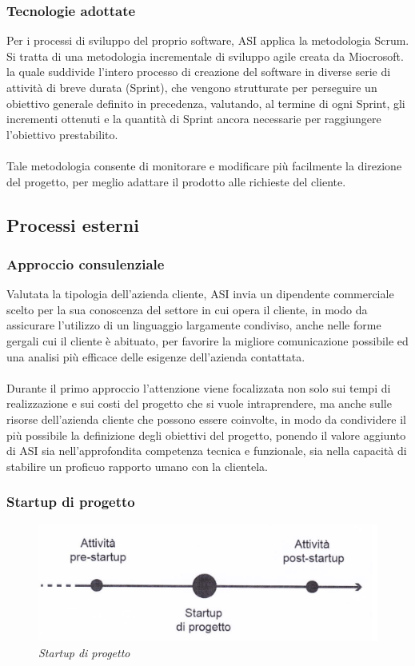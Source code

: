 \subsubsection{Tecnologie adottate}
Per i processi di sviluppo del proprio software, ASI applica la metodologia Scrum.\\
Si tratta di una metodologia incrementale di sviluppo agile creata da Miocrosoft. la quale suddivide l'intero processo di creazione del software in diverse serie di attività di breve durata (Sprint), che vengono strutturate per perseguire un obiettivo generale definito in precedenza, valutando, al termine di ogni Sprint, gli incrementi ottenuti e la quantità di Sprint ancora necessarie per raggiungere l'obiettivo prestabilito.
\\\\
Tale metodologia consente di monitorare e modificare più facilmente la direzione del progetto, per meglio adattare il prodotto alle richieste del cliente.
\subsection{Processi esterni}
\subsubsection{Approccio consulenziale}
Valutata la tipologia dell'azienda cliente, ASI invia un dipendente commerciale scelto per la sua conoscenza del settore in cui opera il cliente, in modo da assicurare l'utilizzo di un linguaggio largamente condiviso, anche nelle forme gergali cui il cliente è abituato, per favorire la migliore comunicazione possibile ed una analisi più efficace delle esigenze dell'azienda contattata.
\\\\
Durante il primo approccio l'attenzione viene focalizzata non solo sui tempi di realizzazione e sui costi del progetto che si vuole intraprendere, ma anche sulle risorse dell'azienda cliente che possono essere coinvolte, in modo da condividere il più possibile la definizione degli obiettivi del progetto, ponendo il valore aggiunto di ASI sia nell'approfondita competenza tecnica e funzionale, sia nella capacità di stabilire un proficuo rapporto umano con la clientela.
\subsubsection{Startup di progetto}

\begin{figure}[ht]
	\centering
	\includegraphics[scale=0.25]{immagini/azienda/startup_di_progetto}
	\caption{\textit{Startup di progetto}}
\end{figure}\FloatBarrier

